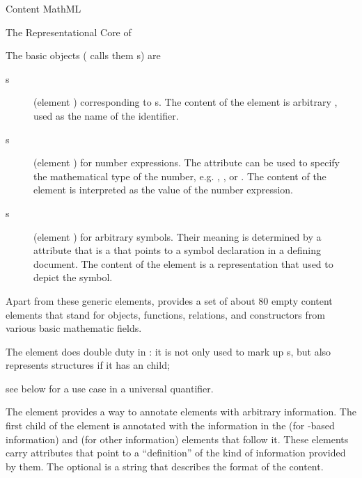 \begin{omgroup}[id=mobj,short=Mathematical Objects]
\begin{omgroup}[id=cmml]{Content MathML}
\begin{module}[id=cMathML]
\begin{omgroup}[id=mathml-core]{The Representational Core of {\cmathml}}
\begin{definition}[display=flow,id=mml.basic.def]
  The basic objects ({\mathml} calls them {s}) are
\begin{description}
  \item[{s}] (element {}) corresponding to
    {s}. The content of the {} element is
    arbitrary {\pmathml}, used as the name of the identifier.
  \item[{s}] (element {}) for number
    expressions. The attribute {} can be used to specify the
    mathematical type of the number, e.g. {}, {}, or
    {}. The content of the {} element is
    interpreted as the value of the number expression.
  \item[{s}] (element {}) for arbitrary
    symbols.  Their meaning is determined by a {} attribute that
    is a {} that points to a symbol declaration in a defining
    document. The content of the {} element is a {\pmathml}
    representation that used to depict the symbol.
  \end{description}
\end{definition}

Apart from these generic elements, {\cmathml} provides a set of about 80 empty
content elements that stand for objects, functions, relations, and constructors
from various basic mathematic fields.

\begin{definition}[id=apply.def]
  The {} element does double duty in {\cmathml}: it is not only
  used to mark up {s}, but also represents {}
  structures if it has an {} child;
\end{definition}
see {} below for a use case in a universal quantifier.

\begin{definition}[id=semantics.def]
  The {} element provides a way to annotate {\cmathml} elements
  with arbitrary information. The first child of the {}
  element is annotated with the information in the {} (for
  {\xml}-based information) and {} (for other information)
  elements that follow it. These elements carry
  {} attributes that point to a
  ``definition'' of the kind of information provided by them. The optional
  {} is a string that describes the format of
  the content.
\end{definition}
\end{omgroup}


\end{module}
\end{omgroup}
\end{omgroup}
